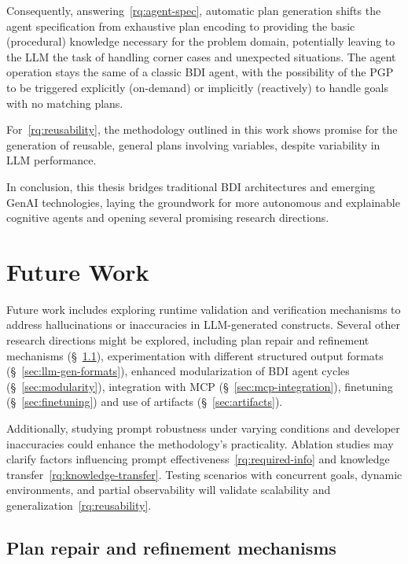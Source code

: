 \documentclass[12pt,a4paper,openright,twoside]{book}
\begin{document}
Consequently, answering~\cref{rq:agent-spec}, automatic plan generation shifts the agent specification from exhaustive plan encoding to providing the basic (procedural) knowledge necessary for the problem domain, potentially leaving to the \ac{LLM} the task of handling corner cases and unexpected situations.
%
The agent operation stays the same of a classic \ac{BDI} agent, with the possibility of the \ac{PGP} to be triggered explicitly (on-demand) or implicitly (reactively) to handle goals with no matching plans.

For~\cref{rq:reusability}, the methodology outlined in this work shows promise for the generation of reusable, general plans involving variables, despite variability in \ac{LLM} performance.

In conclusion, this thesis bridges traditional \ac{BDI} architectures and emerging \ac{GenAI} technologies, laying the groundwork for more autonomous and explainable cognitive agents and opening several promising research directions.

\section{Future Work}

Future work includes exploring runtime validation and verification mechanisms to address hallucinations or inaccuracies in \ac{LLM}-generated constructs.
%
Several other research directions might be explored, including plan repair and refinement mechanisms (\S~\ref{sec:plan-repair}), experimentation with different structured output formats (\S~\ref{sec:llm-gen-formats}), enhanced modularization of BDI agent cycles (\S~\ref{sec:modularity}), integration with \ac{MCP} (\S~\ref{sec:mcp-integration}), finetuning (\S~\ref{sec:finetuning}) and use of artifacts (\S~\ref{sec:artifacts}).

Additionally, studying prompt robustness under varying conditions and developer inaccuracies could enhance the methodology's practicality.
%
Ablation studies may clarify factors influencing prompt effectiveness~\ref{rq:required-info} and knowledge transfer~\ref{rq:knowledge-transfer}.
%
Testing scenarios with concurrent goals, dynamic environments, and partial observability will validate scalability and generalization~\ref{rq:reusability}.

\subsection{Plan repair and refinement mechanisms}\label{sec:plan-repair}
\end{document}
